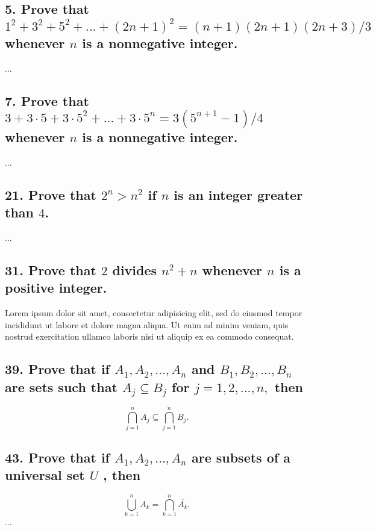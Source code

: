 \documentclass[11pt, oneside]{article} %
\numberwithin{equation}{section} %
\numberwithin{figure}{section} %
\numberwithin{table}{section} %
\begin{document}
\subsection{5. Prove that $1^2 +3^2 +5^2 +...+(2n+1)^2 =(n+1) (2n + 1)(2n + 3)/3$ whenever $n$ is a nonnegative integer.}
...

\subsection{7. Prove that $3+3\cdot 5+3 \cdot 5^2+...+3 \cdot 5^n=3(5^{n+1} -1)/4$ whenever $n$ is a nonnegative integer.}
...



\subsection{21. Prove that $2^n > n^2$ if $n$ is an integer greater than $4$.}
...


\subsection{31. Prove that $2$ divides $n^2 + n$ whenever $n$ is a positive integer.}
Lorem ipsum dolor sit amet, consectetur adipisicing elit, sed do eiusmod tempor incididunt ut labore et dolore magna aliqua. Ut enim ad minim veniam, quis nostrud exercitation ullamco laboris nisi ut aliquip ex ea commodo consequat. 
\subsection{39. Prove that if $A_1,A_2,...,A_n$ and $B_1,B_2,...,B_n$ are sets such that $A_j \subseteq B_j$ for $j = 1,2,...,n,$ then}
\begin{displaymath}
 \displaystyle\bigcap^n_{j = 1} A_j \subseteq \bigcap^n_{j = 1} B_j.
\end{displaymath}

\subsection{43. Prove that if $A_1, A_2,..., A_n$ are subsets of a universal set $U$ , then}
\begin{displaymath}
 \displaystyle\bigcup^n_{k = 1} A_k = \bigcap^n_{k = 1} \overline{A_k}.
\end{displaymath}
...
\end{document}
